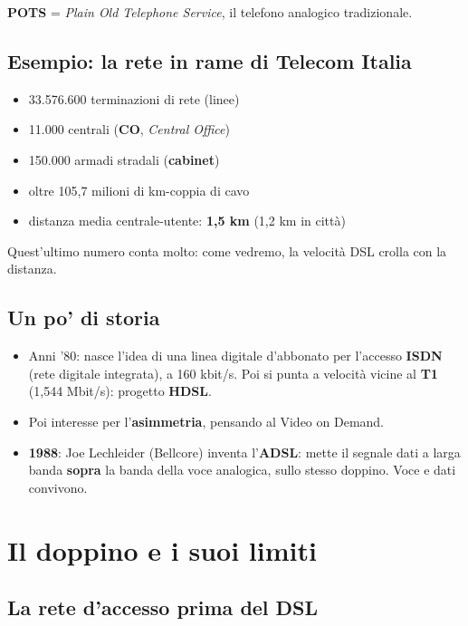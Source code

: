 \textbf{POTS} = \emph{Plain Old Telephone Service}, il telefono analogico tradizionale.

\subsection{Esempio: la rete in rame di Telecom Italia}

\begin{itemize}
\tightlist
\item
  33.576.600 terminazioni di rete (linee)
\item
  11.000 centrali (\textbf{CO}, \emph{Central Office})
\item
  150.000 armadi stradali (\textbf{cabinet})
\item
  oltre 105,7 milioni di km-coppia di cavo
\item
  distanza media centrale-utente: \textbf{1,5 km} (1,2 km in città)
\end{itemize}

Quest'ultimo numero conta molto: come vedremo, la velocità DSL crolla con la distanza.

\subsection{Un po' di storia}

\begin{itemize}
\tightlist
\item
  Anni '80: nasce l'idea di una linea digitale d'abbonato per l'accesso \textbf{ISDN} (rete digitale integrata), a 160 kbit/s. Poi si punta a velocità vicine al \textbf{T1} (1,544 Mbit/s): progetto \textbf{HDSL}.
\item
  Poi interesse per l'\textbf{asimmetria}, pensando al Video on Demand.
\item
  \textbf{1988}: Joe Lechleider (Bellcore) inventa l'\textbf{ADSL}: mette il segnale dati a larga banda \textbf{sopra} la banda della voce analogica, sullo stesso doppino. Voce e dati convivono.
\end{itemize}

\section{Il doppino e i suoi limiti}

\subsection{La rete d'accesso prima del DSL}

